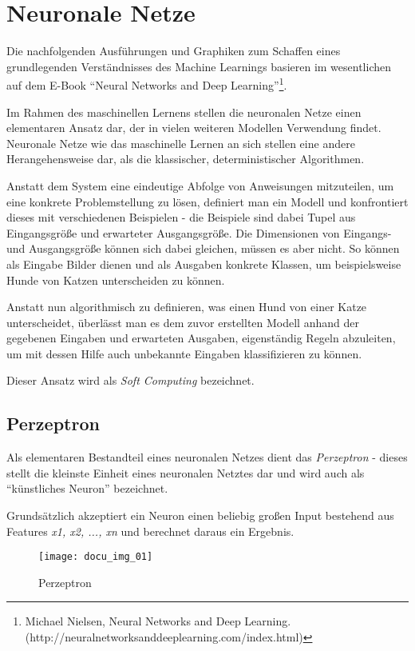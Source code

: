 \section{Neuronale Netze}

Die nachfolgenden Ausführungen und Graphiken zum Schaffen eines grundlegenden Verständnisses des Machine Learnings
basieren im wesentlichen auf dem E-Book ``Neural Networks and Deep Learning''\footnote{Michael Nielsen, Neural Networks and Deep Learning.\newline
(http://neuralnetworksanddeeplearning.com/index.html)}.

Im Rahmen des maschinellen Lernens stellen die neuronalen Netze einen elementaren Ansatz dar,
der in vielen weiteren Modellen Verwendung findet. Neuronale Netze wie das maschinelle Lernen an sich
stellen eine andere Herangehensweise dar, als die klassischer, deterministischer Algorithmen.

Anstatt dem System eine eindeutige Abfolge von Anweisungen mitzuteilen, um eine konkrete Problemstellung
zu lösen, definiert man ein Modell und konfrontiert dieses mit verschiedenen Beispielen - die Beispiele
sind dabei Tupel aus Eingangsgröße und erwarteter Ausgangsgröße. Die Dimensionen von Eingangs- und Ausgangsgröße
können sich dabei gleichen, müssen es aber nicht. So können als Eingabe Bilder dienen und als
Ausgaben konkrete Klassen, um beispielsweise Hunde von Katzen unterscheiden zu können.

Anstatt nun algorithmisch zu definieren, was einen Hund von einer Katze unterscheidet, überlässt man es dem zuvor
erstellten Modell anhand der gegebenen Eingaben und erwarteten Ausgaben, eigenständig Regeln abzuleiten, um mit
dessen Hilfe auch unbekannte Eingaben klassifizieren zu können.

Dieser Ansatz wird als \textit{Soft Computing} bezeichnet.

\subsection{Perzeptron}

Als elementaren Bestandteil eines neuronalen Netzes dient das \textit{Perzeptron} - dieses stellt
die kleinste Einheit eines neuronalen Netztes dar und wird auch als ``künstliches Neuron'' bezeichnet.

Grundsätzlich akzeptiert ein Neuron einen beliebig großen Input bestehend aus Features \textit{x1, x2, ..., xn} und
berechnet daraus ein Ergebnis.

\begin{figure}[h]
    \centering
    \texttt{[image: docu\_img\_01]}
    \caption{Perzeptron}
    \label{fig:perzeptron}
\end{figure}

